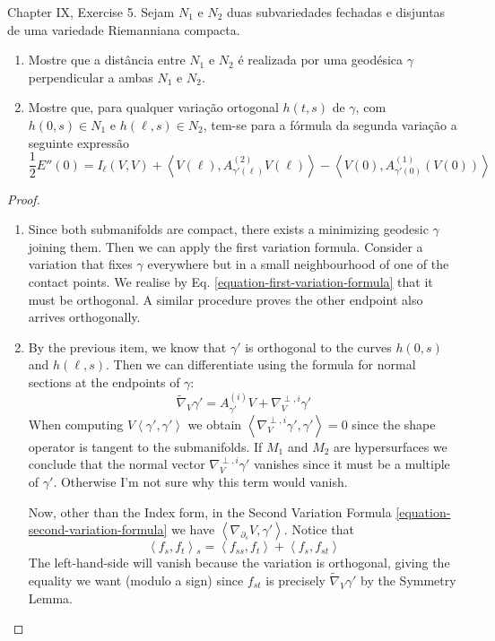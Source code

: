 \begin{exercise}
\label{exercise-two-submanifolds}
\cite{doc} Chapter IX, Exercise 5. Sejam
$N_1$ e $N_2$ duas subvariedades
 fechadas e disjuntas de uma variedade
 Riemanniana compacta.
\begin{enumerate}
\item Mostre que a distância entre $N_1$ e
$N_2$ é realizada por uma geodésica
	$\gamma$ perpendicular a ambas $N_1$ e
	$N_2$.
\item Mostre que, para qualquer variação
ortogonal $h(t,s)$ de $\gamma$, com
$h(0,s) \in N_1$ e $h(\ell,s) \in N_2$,
tem-se para a fórmula da segunda
variação a seguinte expressão
$$
\frac{1}{2}E''(0)=I_{\ell}(V,V)+
\left\langle{}V(\ell),A_{\gamma'(\ell)}^{(2)}V(\ell)
\right\rangle{}
-\left\langle{}V(0),A^{(1)}_{\gamma'(0)}(V(0))\right\rangle{}
$$
\end{enumerate}
\end{exercise}

\begin{proof}
\begin{enumerate}
\item Since both submanifolds are compact,
there exists a minimizing geodesic
$\gamma$ joining them. Then we can apply the
first variation formula. Consider a
variation that fixes $\gamma$ everywhere but
in a small neighbourhood of one of
the contact points. We realise by Eq.
\ref{equation-first-variation-formula}
that it must be orthogonal. A similar
procedure proves the other endpoint also
arrives orthogonally.

\item By the previous item, we
know that $\gamma'$ is orthogonal to the
curves $h(0,s)$ and $h(\ell,s)$. Then
we can differentiate using the formula for
normal sections at the endpoints of
$\gamma$:
$$
\tilde{\nabla}_{V}\gamma'=A^{(i)}_{\gamma'}V+
\nabla^{\perp,i}_V\gamma'
$$
When computing
$V\left\langle{}\gamma',\gamma'\right\rangle{}$ we obtain
$\left\langle{}\nabla^{\perp,i}_V\gamma',
\gamma'\right\rangle{}=0$
since the shape operator is
tangent to the submanifolds. If $M_1$ and
$M_2$ are hypersurfaces we conclude
that the normal vector
$\nabla^{\perp,i}_V\gamma'$ vanishes since it
must be a
multiple of $\gamma'$. Otherwise I'm not sure
why this term would vanish.

Now, other than the Index form, in the Second
Variation Formula
\ref{equation-second-variation-formula} we
have
$\left\langle{}\nabla_{\partial_s}V,\gamma'\right\rangle{}$.
Notice that
$$
\left\langle{}f_s,f_t\right\rangle{}_s=\left\langle{}f_{ss},
f_t\right\rangle{}+\left\langle{}f_s,f_{st}\right\rangle{}
$$
The left-hand-side will vanish because the
variation is orthogonal, giving the
equality we want (modulo a sign) since
$f_{st}$ is precisely
$\tilde{\nabla}_V\gamma'$ by the Symmetry
Lemma.
\end{enumerate}
\end{proof}


